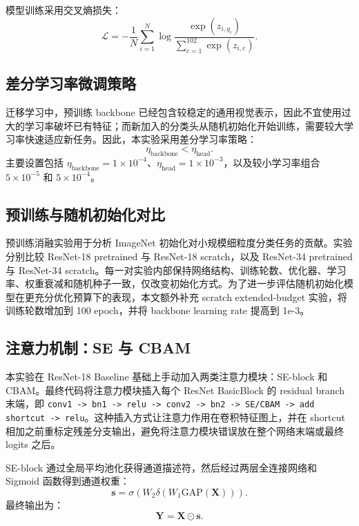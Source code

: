 \documentclass[UTF8]{ctexart}
\begin{document}
模型训练采用交叉熵损失：
\begin{equation}
\mathcal{L}=-\frac{1}{N}\sum_{i=1}^{N}\log \frac{\exp(z_{i,y_i})}{\sum_{c=1}^{102}\exp(z_{i,c})}.
\label{eq:cross-entropy}
\end{equation}

\subsection{差分学习率微调策略}
迁移学习中，预训练 backbone 已经包含较稳定的通用视觉表示，因此不宜使用过大的学习率破坏已有特征；而新加入的分类头从随机初始化开始训练，需要较大学习率快速适应新任务。因此，本实验采用差分学习率策略：
\begin{equation}
\eta_{\text{backbone}} < \eta_{\text{head}}.
\label{eq:differential-lr}
\end{equation}
主要设置包括 \(\eta_{\text{backbone}}=1\times10^{-4}\)、\(\eta_{\text{head}}=1\times10^{-3}\)，以及较小学习率组合 \(5\times10^{-5}\) 和 \(5\times10^{-4}\)。

\subsection{预训练与随机初始化对比}
预训练消融实验用于分析 ImageNet 初始化对小规模细粒度分类任务的贡献。实验分别比较 ResNet-18 pretrained 与 ResNet-18 scratch，以及 ResNet-34 pretrained 与 ResNet-34 scratch。每一对实验内部保持网络结构、训练轮数、优化器、学习率、权重衰减和随机种子一致，仅改变初始化方式。为了进一步评估随机初始化模型在更充分优化预算下的表现，本文额外补充 scratch extended-budget 实验，将训练轮数增加到 100 epoch，并将 backbone learning rate 提高到 1e-3。

\subsection{注意力机制：SE 与 CBAM}
本实验在 ResNet-18 Baseline 基础上手动加入两类注意力模块：SE-block 和 CBAM。最终代码将注意力模块插入每个 ResNet BasicBlock 的 residual branch 末端，即 \verb|conv1 -> bn1 -> relu -> conv2 -> bn2 -> SE/CBAM -> add shortcut -> relu|。这种插入方式让注意力作用在卷积特征图上，并在 shortcut 相加之前重标定残差分支输出，避免将注意力模块错误放在整个网络末端或最终 logits 之后。

SE-block 通过全局平均池化获得通道描述符，然后经过两层全连接网络和 Sigmoid 函数得到通道权重：
\begin{equation}
\mathbf{s}=\sigma(W_2\delta(W_1\text{GAP}(\mathbf{X}))).
\label{eq:se}
\end{equation}
最终输出为：
\begin{equation}
\mathbf{Y}=\mathbf{X}\odot \mathbf{s}.
\label{eq:se-output}
\end{equation}
\end{document}
